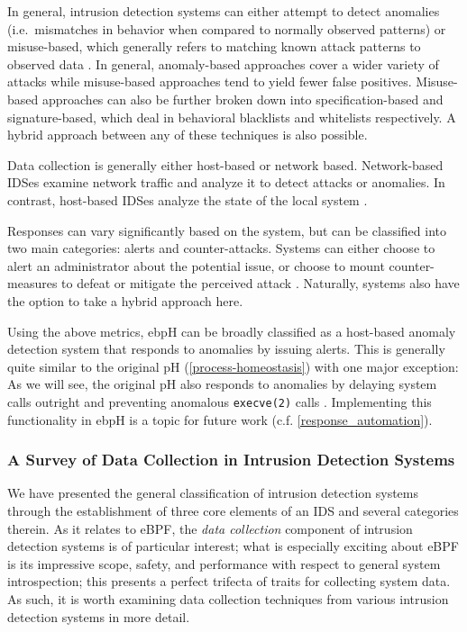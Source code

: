 \documentclass[
  12pt]{findlay}
\newcommand{\passthrough}[1]{#1}
\begin{document}
In general, intrusion detection systems can either attempt to detect
anomalies (i.e.~mismatches in behavior when compared to normally
observed patterns) or misuse-based, which generally refers to matching
known attack patterns to observed data
\autocite{kemmerer02,vanoorschot19}. In general, anomaly-based
approaches cover a wider variety of attacks while misuse-based
approaches tend to yield fewer false positives. Misuse-based approaches
can also be further broken down into specification-based and
signature-based, which deal in behavioral blacklists and whitelists
respectively. A hybrid approach between any of these techniques is also
possible.

Data collection is generally either host-based or network based.
Network-based IDSes examine network traffic and analyze it to detect
attacks or anomalies. In contrast, host-based IDSes analyze the state of
the local system \autocite{kemmerer02,soma02}.

Responses can vary significantly based on the system, but can be
classified into two main categories: alerts and counter-attacks. Systems
can either choose to alert an administrator about the potential issue,
or choose to mount counter-measures to defeat or mitigate the perceived
attack \autocite{kemmerer02}. Naturally, systems also have the option to
take a hybrid approach here.

Using the above metrics, ebpH can be broadly classified as a host-based
anomaly detection system that responds to anomalies by issuing alerts.
This is generally quite similar to the original pH
(\autoref{process-homeostasis}) with one major exception: As we will
see, the original pH also responds to anomalies by delaying system calls
outright and preventing anomalous \passthrough{\lstinline!execve(2)!}
calls \autocite{soma02}. Implementing this functionality in ebpH is a
topic for future work (c.f. \autoref{response_automation}).

\hypertarget{a-survey-of-data-collection-in-intrusion-detection-systems}{%
\subsubsection{A Survey of Data Collection in Intrusion Detection
Systems}\label{a-survey-of-data-collection-in-intrusion-detection-systems}}

\label{data_collection_survey}

We have presented the general classification of intrusion detection
systems through the establishment of three core elements of an IDS and
several categories therein. As it relates to eBPF, the \emph{data
collection} component of intrusion detection systems is of particular
interest; what is especially exciting about eBPF is its impressive
scope, safety, and performance with respect to general system
introspection; this presents a perfect trifecta of traits for collecting
system data. As such, it is worth examining data collection techniques
from various intrusion detection systems in more detail.
\end{document}
